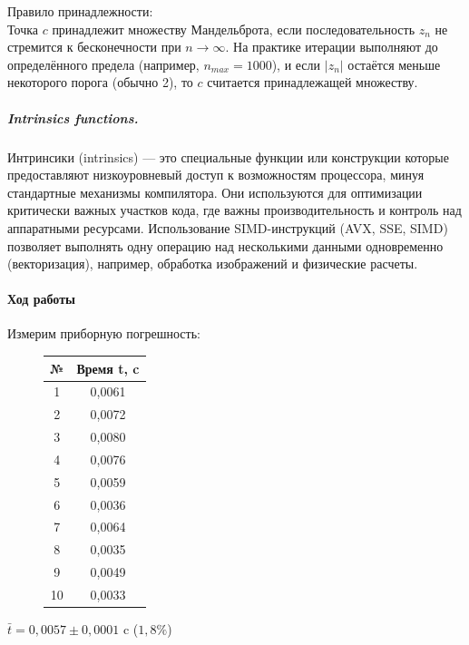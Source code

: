 \documentclass[12pt, letterpaper]{article}
\begin{document}
    Правило принадлежности:\\
    Точка $c$ принадлежит множеству Мандельброта, если последовательность $z_n$ не стремится к бесконечности при $n \to \infty$. На практике итерации выполняют до определённого предела (например, $n_{max} = 1000$), и если $\left| z_n \right|$ остаётся меньше некоторого порога (обычно 2), то $c$ считается принадлежащей множеству.

    \subparagraph{Intrinsics functions.}
    Интринсики (intrinsics) — это специальные функции или конструкции которые предоставляют низкоуровневый доступ к возможностям процессора, минуя стандартные механизмы компилятора. Они используются для оптимизации критически важных участков кода, где важны производительность и контроль над аппаратными ресурсами. Использование SIMD-инструкций (AVX, SSE, SIMD) позволяет выполнять одну операцию над несколькими данными одновременно (векторизация), например, обработка изображений и физические расчеты.

    \paragraph{Ход работы}
    Измерим приборную погрешность:\\

    \begin{figure}
        \begin{tabular}{cc}
        \toprule             %
        \textbf{№} & \textbf{Время t, c} \\
        \midrule             %
        1 & 0,0061 \\
        2 & 0,0072 \\
        3 & 0,0080 \\
        4 & 0,0076 \\
        5 & 0,0059 \\
        6 & 0,0036 \\
        7 & 0,0064 \\
        8 & 0,0035 \\
        9 & 0,0049 \\
        10 & 0,0033 \\
        \bottomrule          %
        \end{tabular}
    \end{figure}

    $\bar{t} = 0,0057 \pm 0,0001$ c ($1,8 \%$)\\
\end{document}
